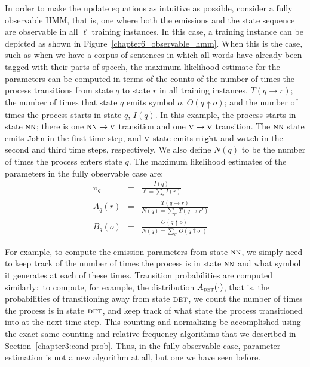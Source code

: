 In order to make the update equations as intuitive as possible,
consider a fully observable HMM, that is, one where both the emissions
and the state sequence are observable in all $\ell$ training
instances.  In this case, a training instance can be depicted as shown
in Figure~\ref{chapter6_observable_hmm}.  When this is the case, such
as when we have a corpus of sentences in which all words have already
been tagged with their parts of speech, the maximum likelihood
estimate for the parameters can be computed in terms of the counts of
the number of times the process transitions from state $q$ to state
$r$ in all training instances, $T(q \rightarrow r)$; the number of
times that state $q$ emits symbol $o$, $O(q \uparrow o)$; and the
number of times the process starts in state $q$, $I(q)$.  In this
example, the process starts in state $\textsc{nn}$; there is one
$\textsc{nn} \rightarrow \textsc{v}$ transition and one $\textsc{v}
\rightarrow \textsc{v}$ transition.  The $\textsc{nn}$ state emits
$\texttt{John}$ in the first time step, and $\textsc{v}$ state emits
$\texttt{might}$ and $\texttt{watch}$ in the second and third time
steps, respectively. We also define $N(q)$ to be the number of times
the process enters state $q$.  The maximum likelihood estimates of the
parameters in the fully observable case are:
\begin{eqnarray}
\label{eq:chapter6_hmmopt1} 
\pi_q   &=& \frac{I(q)}{\ell = \sum_{r} I(r)} \quad \\
\label{eq:chapter6_hmmopt2} 
 A_q(r) &=& \frac{T(q \rightarrow r)}{N(q) = \sum_{r'} T(q \rightarrow r')} \quad\\
\label{eq:chapter6_hmmopt3} 
 B_q(o) &=& \frac{O(q \uparrow o)}{N(q) = \sum_{o'} O(q \uparrow o')}
\end{eqnarray}

\noindent For example, to compute the emission parameters from state
$\textsc{nn}$, we simply need to keep track of the number of times the
process is in state $\textsc{nn}$ and what symbol it generates at each
of these times.  Transition probabilities are computed similarly:\ to
compute, for example, the distribution $A_{\textsc{det}}(\cdot)$, that
is, the probabilities of transitioning away from state $\textsc{det}$,
we count the number of times the process is in state $\textsc{det}$,
and keep track of what state the process transitioned into at the next
time step.  This counting and normalizing be accomplished using the
exact same counting and relative frequency algorithms that we
described in Section~\ref{chapter3:cond-prob}.  Thus, in the fully
observable case, parameter estimation is not a new algorithm at all,
but one we have seen before.

